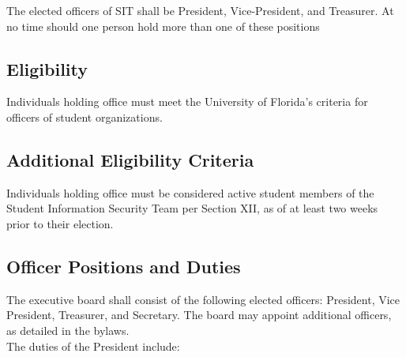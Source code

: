 \documentclass{article}
\def\clubname{SIT }
\def\clubfullname{Student Information Security Team }
\begin{document}
The elected officers of \clubname shall be President, Vice-President, and Treasurer. At no time should one person hold more than one of these positions

\subsection{Eligibility}
Individuals holding office must meet the University of Florida’s criteria for officers of student organizations.

\subsection{Additional Eligibility Criteria}
Individuals holding office must be considered active student members of the \clubfullname per Section XII, as of at least two weeks prior to their election.

\subsection{Officer Positions and Duties}

The executive board shall consist of the following elected officers: President, Vice President, Treasurer, and Secretary. The board may appoint additional officers, as detailed in the bylaws. \\

\noindent
The duties of the President include:
\end{document}
